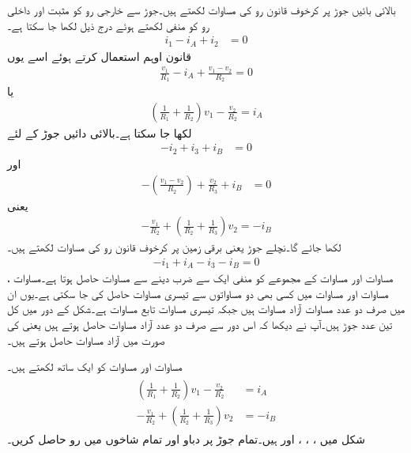 بالائی بائیں جوڑ پر کرخوف قانون رو کی مساوات لکھتے ہیں۔جوڑ سے خارجی رو کو مثبت اور داخلی رو کو منفی لکھتے ہوئے درج ذیل لکھا جا سکتا ہے۔
\begin{align}\label{مساوات_جوڑ_پہلی_مثال_الف}
i_1-i_A+i_2&=0
\end{align}
قانون اوہم استعمال کرتے ہوئے اسے یوں
\begin{align*}
\frac{v_1}{R_1}-i_A+\frac{v_1-v_2}{R_2}=0
\end{align*}
یا 
\begin{align}\label{مساوات_جوڑ_پہلی_مثال_ب}
\left( \frac{1}{R_1}+\frac{1}{R_2}\right) v_1 - \frac{v_2}{R_2}=i_A
\end{align}
لکھا جا سکتا ہے۔بالائی دائیں جوڑ کے لئے
\begin{align}\label{مساوات_جوڑ_پہلی_مثال_پ}
-i_2+i_3+i_B&=0
\end{align}
اور
\begin{align*}
-\left(\frac{v_1-v_2}{R_2}\right)+\frac{v_2}{R_3}+i_B&=0
\end{align*}
یعنی
\begin{align}\label{مساوات_جوڑ_پہلی_مثال_ت}
-\frac{v_1}{R_2}+\left(\frac{1}{R_2}+\frac{1}{R_3}\right)v_2=-i_B
\end{align}
لکھا جائے گا۔نچلے جوڑ یعنی برقی زمین پر  کرخوف قانون رو کی مساوات لکھتے ہیں۔
\begin{align}\label{مساوات_جوڑ_پہلی_مثال_ٹ}
-i_1+i_A-i_3-i_B=0
\end{align}
مساوات  اور مساوات  کے مجموعے کو منفی ایک سے ضرب دینے سے مساوات  حاصل ہوتا ہے۔مساوات ، مساوات  اور  مساوات  میں کسی بھی دو مساواتوں سے تیسری مساوات حاصل کی جا سکتی ہے۔یوں ان میں صرف دو عدد مساوات آزاد مساوات ہیں جبکہ تیسری مساوات تابع مساوات ہے۔شکل  کے دور میں کل تین عدد جوڑ ہیں۔آپ نے دیکھا کہ اس دور سے صرف دو عدد آزاد مساوات حاصل ہوتے ہیں یعنی  کی صورت میں  آزاد مساوات حاصل ہوتے ہیں۔


مساوات  اور مساوات  کو ایک ساتھ لکھتے ہیں۔
\begin{gather}
\begin{aligned}\label{مساوات_جوڑ_آزاد_مساوات_دو_جوڑ}
\left( \frac{1}{R_1}+\frac{1}{R_2}\right) v_1 - \frac{v_2}{R_2}&=i_A\\
-\frac{v_1}{R_2}+\left(\frac{1}{R_2}+\frac{1}{R_3}\right)v_2&=-i_B
\end{aligned}
\end{gather}
شکل  میں ، ، ،  اور  ہیں۔تمام جوڑ پر دباو اور تمام شاخوں میں رو حاصل کریں۔

